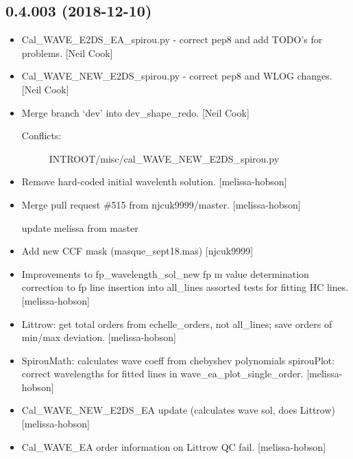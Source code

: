 \documentclass[a4paper,10pt,english]{report}
\begin{document}
\subsection{0.4.003 (2018-12-10)}
\label{\detokenize{misc/changelog:id241}}\begin{itemize}
\item {} 
Cal\_WAVE\_E2DS\_EA\_spirou.py - correct pep8 and add TODO’s for problems.
{[}Neil Cook{]}

\item {} 
Cal\_WAVE\_NEW\_E2DS\_spirou.py - correct pep8 and WLOG changes. {[}Neil
Cook{]}

\item {} 
Merge branch ‘dev’ into dev\_shape\_redo. {[}Neil Cook{]}
\begin{description}
\item[{Conflicts:}] \leavevmode
INTROOT/misc/cal\_WAVE\_NEW\_E2DS\_spirou.py

\end{description}

\item {} 
Remove hard-coded initial wavelenth solution. {[}melissa-hobson{]}

\item {} 
Merge pull request \#515 from njcuk9999/master. {[}melissa-hobson{]}

update melissa from master

\item {} 
Add new CCF mask (masque\_sept18.mas) {[}njcuk9999{]}

\item {} 
Improvements to fp\_wavelength\_sol\_new fp m value determination
correction to fp line insertion into all\_lines assorted tests for
fitting HC lines. {[}melissa-hobson{]}

\item {} 
Littrow: get total orders from echelle\_orders, not all\_lines; save
orders of min/max deviation. {[}melissa-hobson{]}

\item {} 
SpirouMath: calculates wave coeff from chebyshev polynomials
spirouPlot: correct wavelengths for fitted lines in
wave\_ea\_plot\_single\_order. {[}melissa-hobson{]}

\item {} 
Cal\_WAVE\_NEW\_E2DS\_EA update (calculates wave sol, does Littrow)
{[}melissa-hobson{]}

\item {} 
Cal\_WAVE\_EA order information on Littrow QC fail. {[}melissa-hobson{]}


\end{itemize}
\end{document}

